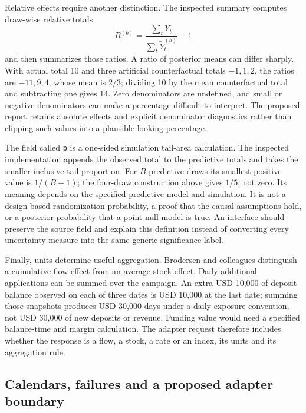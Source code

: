 Relative effects require another distinction. The inspected summary computes
draw-wise relative totals
\[
 R^{(b)}=\frac{\sum_tY_t}{\sum_t\widetilde Y_t^{(b)}}-1
\]
and then summarizes those ratios. A ratio of posterior means can differ
sharply. With actual total 10 and three artificial counterfactual totals
\(-1,1,2\), the ratios are \(-11,9,4\), whose mean is \(2/3\); dividing
10 by the mean counterfactual total and subtracting one gives 14. Zero
denominators are undefined, and small or negative denominators can make a
percentage difficult to interpret. The proposed report retains absolute
effects and explicit denominator diagnostics rather than clipping such
values into a plausible-looking percentage. \citep{exec13_ci_semantics,exec13_cimpact_examples}

The field called \texttt{p} is a one-sided simulation tail-area calculation.
The inspected implementation appends the observed total to the predictive
totals and takes the smaller inclusive tail proportion. For \(B\) predictive
draws its smallest positive value is \(1/(B+1)\); the four-draw construction
above gives \(1/5\), not zero. Its meaning depends on the specified predictive
model and simulation. It is not a design-based randomization probability, a
proof that the causal assumptions hold, or a posterior probability that a
point-null model is true. An interface should preserve the source field and
explain this definition instead of converting every uncertainty measure into
the same generic significance label. \citep{exec13_ci_semantics,exec13_cimpact_examples}

Finally, units determine useful aggregation. Brodersen and colleagues
distinguish a cumulative flow effect from an average stock effect. Daily
additional applications can be summed over the campaign. An extra USD 10,000
of deposit balance observed on each of three dates is USD 10,000 at the last
date; summing those snapshots produces USD 30,000-days under a daily exposure
convention, not USD 30,000 of new deposits or revenue. Funding value would
need a specified balance-time and margin calculation. The adapter request
therefore includes whether the response is a flow, a stock, a rate or an
index, its units and its aggregation rule.
\citep{exec13_ci_brodersen2015,exec13_cimpact_examples}

\subsection{Calendars, failures and a proposed adapter boundary}

